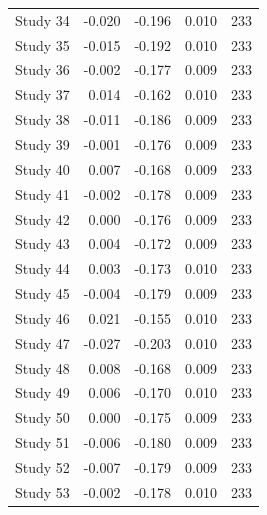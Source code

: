 \begin{table}[!h]
{\begin{tabular}[t]{rrrrr}
\hspace{1em}Study 34 & -0.020 & -0.196 & 0.010 & 233\\
\hspace{1em}Study 35 & -0.015 & -0.192 & 0.010 & 233\\
\hspace{1em}Study 36 & -0.002 & -0.177 & 0.009 & 233\\
\hspace{1em}Study 37 & 0.014 & -0.162 & 0.010 & 233\\
\hspace{1em}Study 38 & -0.011 & -0.186 & 0.009 & 233\\
\hspace{1em}Study 39 & -0.001 & -0.176 & 0.009 & 233\\
\hspace{1em}Study 40 & 0.007 & -0.168 & 0.009 & 233\\
\hspace{1em}Study 41 & -0.002 & -0.178 & 0.009 & 233\\
\hspace{1em}Study 42 & 0.000 & -0.176 & 0.009 & 233\\
\hspace{1em}Study 43 & 0.004 & -0.172 & 0.009 & 233\\
\hspace{1em}Study 44 & 0.003 & -0.173 & 0.010 & 233\\
\hspace{1em}Study 45 & -0.004 & -0.179 & 0.009 & 233\\
\hspace{1em}Study 46 & 0.021 & -0.155 & 0.010 & 233\\
\hspace{1em}Study 47 & -0.027 & -0.203 & 0.010 & 233\\
\hspace{1em}Study 48 & 0.008 & -0.168 & 0.009 & 233\\
\hspace{1em}Study 49 & 0.006 & -0.170 & 0.010 & 233\\
\hspace{1em}Study 50 & 0.000 & -0.175 & 0.009 & 233\\
\hspace{1em}Study 51 & -0.006 & -0.180 & 0.009 & 233\\
\hspace{1em}Study 52 & -0.007 & -0.179 & 0.009 & 233\\
\hspace{1em}Study 53 & -0.002 & -0.178 & 0.010 & 233\\

\end{tabular}}
\end{table}
